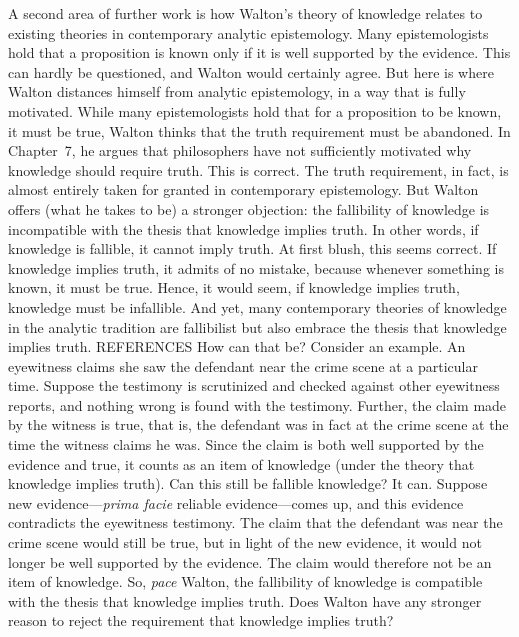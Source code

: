 \documentclass[12pt]{article}
\begin{document}
A second area of further work is how Walton's theory of knowledge relates to existing theories 
in contemporary analytic epistemology. 
Many epistemologists hold that a proposition is known 
only if it is well supported by the evidence. This can hardly be questioned, 
and Walton would certainly agree.  
But here is where Walton distances himself 
from analytic epistemology, in a way that is fully motivated. 
While many epistemologists hold that 
for a proposition to be known, it must be true, Walton thinks that the truth requirement 
must be abandoned. In Chapter~7, he argues that philosophers have not sufficiently motivated why knowledge 
should require truth. This is correct. The truth requirement, in fact, is almost 
entirely taken for granted in contemporary epistemology. But Walton offers 
(what he takes to be) a stronger objection: the fallibility of knowledge is incompatible with 
the thesis that knowledge implies truth.  
In other words, if knowledge is fallible, 
it cannot imply truth. At first blush, this seems correct. If knowledge implies truth, it admits of no mistake, because whenever 
something is known, it must be true. 
Hence, it would seem, if knowledge implies truth, knowledge must be infallible. 
And yet, many contemporary theories of knowledge in the analytic tradition are fallibilist 
but also embrace the thesis that knowledge implies truth. 
REFERENCES
How can that be? 
Consider an example. 
An eyewitness claims she saw the defendant near the crime scene at a particular time.
Suppose the testimony is scrutinized and checked against other eyewitness reports, and nothing 
wrong is found with the testimony.
Further, the claim made by the witness is true, that is, the defendant was in fact at the crime scene 
at the time the witness claims he was. Since the claim is both well supported by the evidence and true,  
it counts as an item of knowledge (under the theory that knowledge implies truth). 
Can this still be fallible knowledge? It can. 
Suppose new evidence---\textit{prima facie} reliable evidence---comes up, and this evidence 
contradicts the eyewitness testimony. The claim that the defendant was near the crime scene would still 
be true, but in light of the new evidence, it would not longer be well supported by the evidence. The 
claim would therefore not be an item of knowledge. 
So, \textit{pace} Walton, the fallibility of knowledge is compatible with 
the thesis that knowledge implies truth. Does Walton have any stronger reason 
to reject the requirement that knowledge implies truth?
\end{document}
